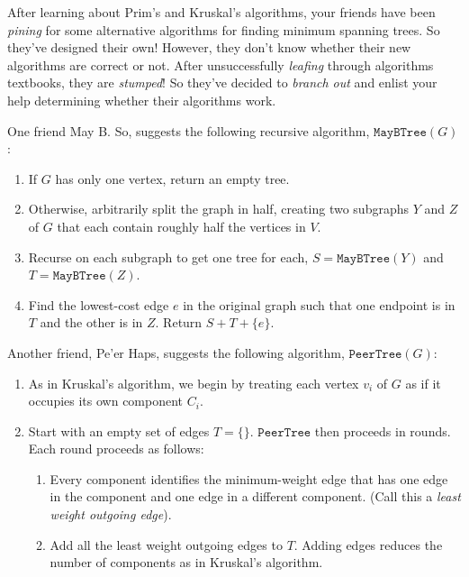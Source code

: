 \documentclass[12 pt, letterpaper]{hmcpset}
\begin{document}
\begin{problem}
	After learning about Prim's and Kruskal's algorithms, your friends have been \emph{pining} for some alternative algorithms for finding minimum spanning trees. So they've designed their own! However, they don't know whether their new algorithms are correct or not. After unsuccessfully \emph{leafing} through algorithms textbooks, they are \emph{stumped}! So they've decided to \emph{branch out} and enlist your help determining whether their algorithms work.

	One friend May B. So, suggests the following recursive algorithm, $\mathtt{MayBTree}(G)$:
	\begin{enumerate}
		\item If $G$ has only one vertex, return an empty tree.

		\item Otherwise, arbitrarily split the graph in half, creating two subgraphs $Y$ and $Z$ of $G$ that each contain roughly half the vertices in $V$.

		\item Recurse on each subgraph to get one tree for each,  $S = \mathtt{MayBTree}(Y)$ and $T = \mathtt{MayBTree}(Z)$.

		\item Find the lowest-cost edge $e$ in the original graph such that one endpoint is in $T$ and the other is in $Z$. Return $S + T + \{ e \}$.
	\end{enumerate}
	Another friend, Pe'er Haps, suggests the following algorithm, $\mathtt{PeerTree}(G)$:
	\begin{enumerate}
		\item As in Kruskal's algorithm, we begin by treating each vertex $v_{i}$ of $G$ as if it occupies its own component $C_{i}$.

		\item Start with an empty set of edges $T = \{  \}$. $\mathtt{PeerTree}$ then proceeds in rounds. Each round proceeds as follows:
			\begin{enumerate}
				\item Every component identifies the minimum-weight edge that has one edge in the component and one edge in a different component. (Call this a \emph{least weight outgoing edge}).

				\item Add all the least weight outgoing edges to $T$. Adding edges reduces the number of components as in Kruskal's algorithm.


\end{enumerate}
\end{enumerate}
\end{problem}
\end{document}
